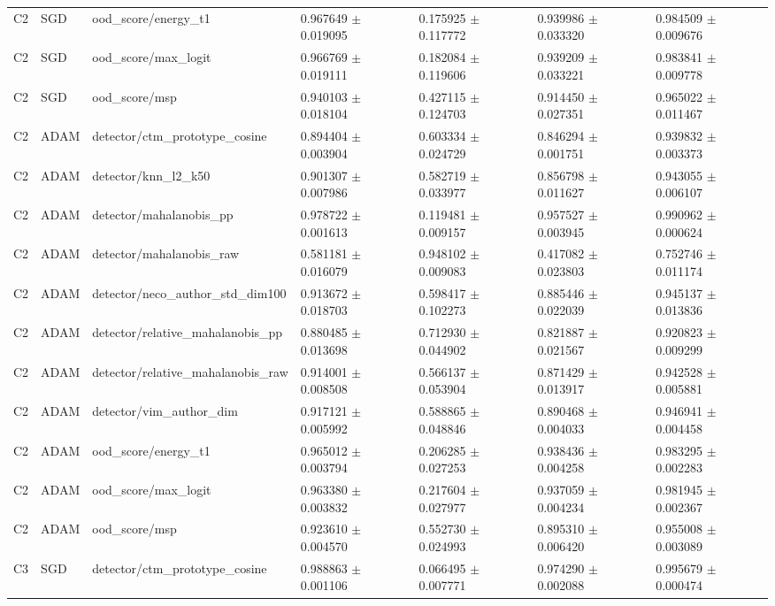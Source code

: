 \begin{longtable}{lllllll}
C2 & SGD & ood\_score/energy\_t1 & 0.967649 $\pm$ 0.019095 & 0.175925 $\pm$ 0.117772 & 0.939986 $\pm$ 0.033320 & 0.984509 $\pm$ 0.009676 \\
C2 & SGD & ood\_score/max\_logit & 0.966769 $\pm$ 0.019111 & 0.182084 $\pm$ 0.119606 & 0.939209 $\pm$ 0.033221 & 0.983841 $\pm$ 0.009778 \\
C2 & SGD & ood\_score/msp & 0.940103 $\pm$ 0.018104 & 0.427115 $\pm$ 0.124703 & 0.914450 $\pm$ 0.027351 & 0.965022 $\pm$ 0.011467 \\
C2 & ADAM & detector/ctm\_prototype\_cosine & 0.894404 $\pm$ 0.003904 & 0.603334 $\pm$ 0.024729 & 0.846294 $\pm$ 0.001751 & 0.939832 $\pm$ 0.003373 \\
C2 & ADAM & detector/knn\_l2\_k50 & 0.901307 $\pm$ 0.007986 & 0.582719 $\pm$ 0.033977 & 0.856798 $\pm$ 0.011627 & 0.943055 $\pm$ 0.006107 \\
C2 & ADAM & detector/mahalanobis\_pp & 0.978722 $\pm$ 0.001613 & 0.119481 $\pm$ 0.009157 & 0.957527 $\pm$ 0.003945 & 0.990962 $\pm$ 0.000624 \\
C2 & ADAM & detector/mahalanobis\_raw & 0.581181 $\pm$ 0.016079 & 0.948102 $\pm$ 0.009083 & 0.417082 $\pm$ 0.023803 & 0.752746 $\pm$ 0.011174 \\
C2 & ADAM & detector/neco\_author\_std\_dim100 & 0.913672 $\pm$ 0.018703 & 0.598417 $\pm$ 0.102273 & 0.885446 $\pm$ 0.022039 & 0.945137 $\pm$ 0.013836 \\
C2 & ADAM & detector/relative\_mahalanobis\_pp & 0.880485 $\pm$ 0.013698 & 0.712930 $\pm$ 0.044902 & 0.821887 $\pm$ 0.021567 & 0.920823 $\pm$ 0.009299 \\
C2 & ADAM & detector/relative\_mahalanobis\_raw & 0.914001 $\pm$ 0.008508 & 0.566137 $\pm$ 0.053904 & 0.871429 $\pm$ 0.013917 & 0.942528 $\pm$ 0.005881 \\
C2 & ADAM & detector/vim\_author\_dim & 0.917121 $\pm$ 0.005992 & 0.588865 $\pm$ 0.048846 & 0.890468 $\pm$ 0.004033 & 0.946941 $\pm$ 0.004458 \\
C2 & ADAM & ood\_score/energy\_t1 & 0.965012 $\pm$ 0.003794 & 0.206285 $\pm$ 0.027253 & 0.938436 $\pm$ 0.004258 & 0.983295 $\pm$ 0.002283 \\
C2 & ADAM & ood\_score/max\_logit & 0.963380 $\pm$ 0.003832 & 0.217604 $\pm$ 0.027977 & 0.937059 $\pm$ 0.004234 & 0.981945 $\pm$ 0.002367 \\
C2 & ADAM & ood\_score/msp & 0.923610 $\pm$ 0.004570 & 0.552730 $\pm$ 0.024993 & 0.895310 $\pm$ 0.006420 & 0.955008 $\pm$ 0.003089 \\
C3 & SGD & detector/ctm\_prototype\_cosine & 0.988863 $\pm$ 0.001106 & 0.066495 $\pm$ 0.007771 & 0.974290 $\pm$ 0.002088 & 0.995679 $\pm$ 0.000474 \\

\end{longtable}
